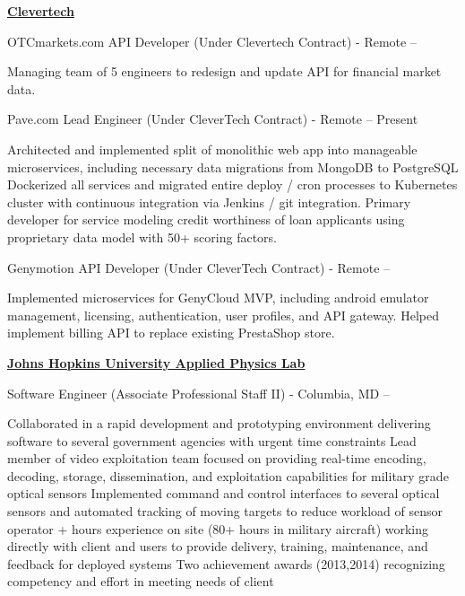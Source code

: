 \documentclass[a4paper,10pt,oneside]{article}
\begin{document}
\begin{body}
\href{http://www.clevertech.biz/}
{\textbf{Clevertech}}
\par
OTCmarkets.com API Developer (Under Clevertech Contract) - Remote
\hfill
{} -- 
\begin{detail}
\BulletItem Managing team of 5 engineers to redesign and update API for financial market data. 
\end{detail}

\par
Pave.com Lead Engineer (Under CleverTech Contract) - Remote
\hfill
{} -- Present
\begin{detail}
\BulletItem Architected and implemented split of monolithic web app into manageable microservices, including necessary data migrations from MongoDB to PostgreSQL
\BulletItem Dockerized all services and migrated entire deploy / cron processes to Kubernetes cluster with continuous integration via Jenkins / git integration. 
\BulletItem Primary developer for service modeling credit worthiness of loan applicants using proprietary data model with 50+ scoring factors. 
\end{detail} 

\par
Genymotion API Developer (Under CleverTech Contract) - Remote
\hfill
{} -- 
\begin{detail}
\BulletItem Implemented microservices for GenyCloud MVP, including android emulator management, licensing, authentication, user profiles, and API gateway. 
\BulletItem Helped implement billing API to replace existing PrestaShop store. 
\end{detail}

\EntryGap

\href{http://www.jhuapl.edu/}
{\textbf{Johns Hopkins University Applied Physics Lab}}
\par
Software Engineer (Associate Professional Staff II) - Columbia, MD
\hfill
{} --
\begin{detail}

\BulletItem
Collaborated in a rapid development and prototyping environment delivering software to several government agencies with urgent time constraints
\BulletItem
Lead member of video exploitation team focused on providing real-time encoding, decoding, storage, dissemination, and exploitation capabilities for military grade optical sensors
\BulletItem
Implemented command and control interfaces to several optical sensors and automated tracking of moving targets to reduce workload of sensor operator
+ hours experience on site (80+ hours in military aircraft) working directly with client and users to provide delivery, training, maintenance, and feedback for deployed systems
\BulletItem
Two achievement awards (2013,2014) recognizing competency and effort in meeting needs of client
\end{detail}


\end{body}
\end{document}
